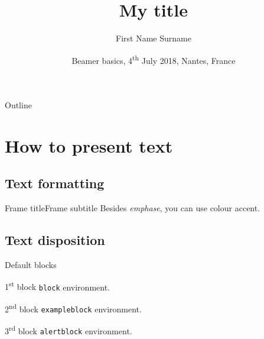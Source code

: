 \documentclass{beamer}
\title[My short title]{My title}
\author[F.\,N. Surname]{First Name Surname}
\institute[Short affiliation]{My affiliation}
\date[2018-07-04]{Beamer basics, 4\textsuperscript{th} July 2018, Nantes, France}
\begin{document}
\maketitle{}

\begin{frame}{Outline}
  \tableofcontents{}
\end{frame}

\section{How to present text}

\subsection{Text formatting}

\begin{frame}{Frame title}{Frame subtitle}
  Besides \emph{emphase}, you can use colour \alert{accent}.
\end{frame}

\subsection{Text disposition}

\begin{frame}{Default blocks}
  
  \begin{block}{1\textsuperscript{st} block}
    \texttt{block} environment.
  \end{block}
  
  \begin{exampleblock}{2\textsuperscript{nd} block}
    \texttt{exampleblock} environment.
  \end{exampleblock}
  
  \begin{alertblock}{3\textsuperscript{rd} block}
    \texttt{alertblock} environment.
  \end{alertblock}
  
\end{frame}
\end{document}
